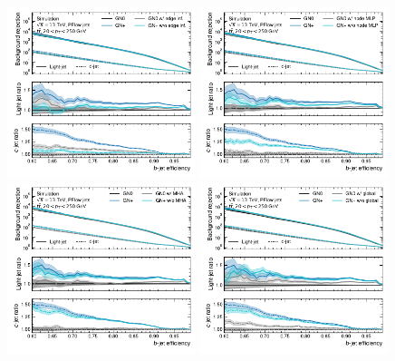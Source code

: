 \begin{figure}[ht]
    \centering
    \includegraphics[width=0.49\textwidth]{figures/flavour_tagging/b_roc_ttbar_edge.pdf}
    \includegraphics[width=0.49\textwidth]{figures/flavour_tagging/b_roc_ttbar_node.pdf}
    \includegraphics[width=0.49\textwidth]{figures/flavour_tagging/b_roc_ttbar_mha.pdf}
    \includegraphics[width=0.49\textwidth]{figures/flavour_tagging/b_roc_ttbar_glob.pdf}

\end{figure}
